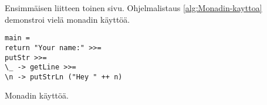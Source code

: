 \documentclass[language=finnish,version=final,mainfont=none,sharelatex=false]{utuftthesis}
\begin{document}
\newpage{}

Ensimmäisen liitteen toinen sivu. Ohjelmalistaus \ref{alg:Monadin-kayttoa}
demonstroi vielä monadin käyttöä.

\begin{algorithm}[tbh]
\begin{verbatim}
main =
return "Your name:" >>=
putStr >>=
\_ -> getLine >>=
\n -> putStrLn ("Hey " ++ n)
\end{verbatim}

\caption{Monadin käyttöä.\label{alg:Monadin-kayttoa}}
\end{algorithm}
\end{document}
